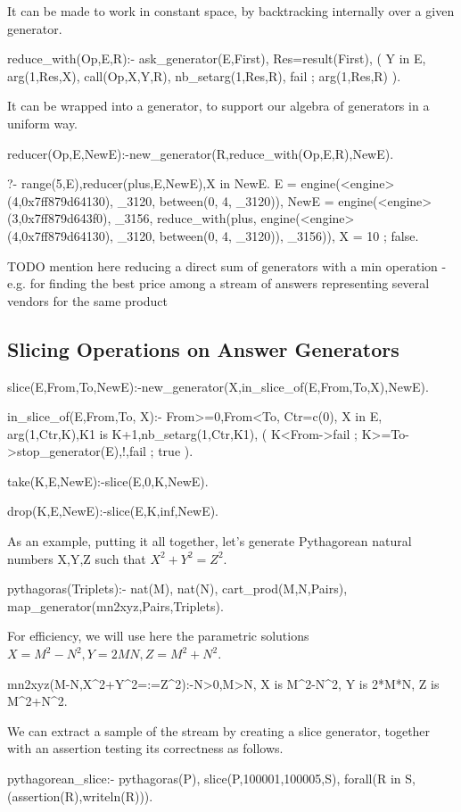 \documentclass{new_tlp}
\begin{document}
It can be made to work in constant space, by
backtracking internally over a given generator.
\begin{code}
reduce_with(Op,E,R):-
  ask_generator(E,First),
  Res=result(First),
  ( Y in E,
    arg(1,Res,X),
    call(Op,X,Y,R),
    nb_setarg(1,Res,R),
    fail
  ; arg(1,Res,R)
  ).
\end{code}

It can be wrapped into a generator, to support our algebra of generators in a uniform way.

\begin{code}
reducer(Op,E,NewE):-new_generator(R,reduce_with(Op,E,R),NewE).
\end{code}

\BX
\begin{codex}
?- range(5,E),reducer(plus,E,NewE),X in NewE.
E = engine(<engine>(4,0x7ff879d64130), _3120, between(0, 4, _3120)),
NewE = engine(<engine>(3,0x7ff879d643f0), _3156, reduce_with(plus,
engine(<engine>(4,0x7ff879d64130), _3120, between(0, 4, _3120)), _3156)),
X = 10 ;
false.
\end{codex}
\EX
\BI
\I TODO mention here reducing a direct sum of generators with a min operation - e.g. for finding the best price among a stream of answers representing several vendors for the same product
\EI

\subsection{Slicing Operations on Answer Generators}
\begin{code}
slice(E,From,To,NewE):-new_generator(X,in_slice_of(E,From,To,X),NewE).

in_slice_of(E,From,To, X):-
  From>=0,From<To,
  Ctr=c(0),
  X in E,
  arg(1,Ctr,K),K1 is K+1,nb_setarg(1,Ctr,K1),
  (
    K<From->fail
  ; K>=To->stop_generator(E),!,fail
  ; true
  ).
  
take(K,E,NewE):-slice(E,0,K,NewE).

drop(K,E,NewE):-slice(E,K,inf,NewE).
\end{code}

As an example, putting it all together, let's generate Pythagorean natural numbers X,Y,Z such
that $X^2+Y^2=Z^2$.

\begin{code}
pythagoras(Triplets):-
  nat(M),
  nat(N),
  cart_prod(M,N,Pairs),
  map_generator(mn2xyz,Pairs,Triplets).
\end{code}
For efficiency, we will use here the parametric solutions
$X=M^2-N^2, Y=2MN, Z=M^2+N^2$.
\begin{code}
mn2xyz(M-N,X^2+Y^2=:=Z^2):-N>0,M>N,
  X is M^2-N^2,
  Y is 2*M*N,
  Z is M^2+N^2.
\end{code}
We can extract a sample of the stream by creating
a slice generator, together with an assertion testing its correctness as follows.
\begin{code}
pythagorean_slice:-
  pythagoras(P),
  slice(P,100001,100005,S),
  forall(R in S,(assertion(R),writeln(R))).
\end{code}
\end{document}
